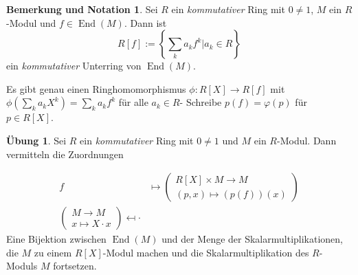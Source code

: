 \documentclass[
twoside=semi,
fontsize=12,
DIV=12, 
cleardoublepage=current,
leqno,
headings=optiontoheadandtoc, 
toc=idx
]{scrbook}
\newcommand{\brac}[1]{\left( #1 \right)}
\newcommand{\set}[1]{\left\{ #1 \right\}}
\DeclareMathOperator{\End}{End}
\theoremstyle{definition}
\newtheorem{uebung}[definition]{\"Ubung}
\newtheorem{bem-not}[definition]{Bemerkung und Notation}
\begin{document}
	\begin{bem-not}\label{1.7.3}
		Sei $R$ ein \emph{kommutativer} Ring mit $0\neq 1$, $M$ ein $R$-Modul und $f \in \End(M)$. Dann ist 
		\[R[f] := \set{\sum_k a_k f^k|a_k \in R}\]
		ein \emph{kommutativer} Unterring von $\End(M)$.
		
		Es gibt genau einen Ringhomomorphismus $\phi:R[X] \to R[f]$ mit $\phi\brac{\sum_k a_k X^k} = \sum_k a_k f^k$ f\"ur alle $a_k \in R$- Schreibe $p(f) = \varphi(p)$ f\"ur $p \in R[X]$.
	\end{bem-not}

	\begin{uebung}\label{1.7.4}
		Sei $R$ ein \emph{kommutativer} Ring mit $0\neq 1$ und $M$ ein $R$-Modul. Dann vermitteln die Zuordnungen
		
		\begin{align*}
			f &\mapsto \begin{pmatrix}
				R[X]\times M \to M\\ (p,x) \mapsto (p(f))(x)
			\end{pmatrix}\\
			\begin{pmatrix}
				M \to M\\
				x \mapsto X \cdot x
			\end{pmatrix} \mapsfrom \cdot
		\end{align*}
		Eine Bijektion zwischen $\End(M)$ und der Menge der Skalarmultiplikationen, die $M$ zu einem $R[X]$-Modul machen und die Skalarmultiplikation des $R$-Moduls $M$ fortsetzen.
	\end{uebung}
\end{document}
